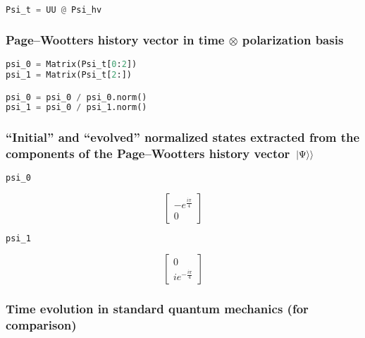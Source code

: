 \begin{lstlisting}[language=Python]
Psi_t = UU @ Psi_hv
\end{lstlisting}

\subsubsection*{Page--Wootters history vector in time $\otimes$ polarization basis}

\begin{lstlisting}[language=Python]
psi_0 = Matrix(Psi_t[0:2])
psi_1 = Matrix(Psi_t[2:])

psi_0 = psi_0 / psi_0.norm()
psi_1 = psi_0 / psi_1.norm()
\end{lstlisting}

\pagebreak\subsubsection*{``Initial'' and ``evolved'' normalized states extracted from the components of the Page--Wootters history vector $\left.\left| \Psi \right\rangle\right\rangle$}

\begin{lstlisting}[language=Python]
psi_0
\end{lstlisting}
$$
  \left[\begin{matrix}- e^{\frac{i \pi}{4}}\\0\end{matrix}\right]
$$
\begin{lstlisting}[language=Python]
psi_1
\end{lstlisting}
$$
  \left[\begin{matrix}0\\i e^{- \frac{i \pi}{4}}\end{matrix}\right]
$$

\subsubsection*{Time evolution in standard quantum mechanics (for comparison)}

